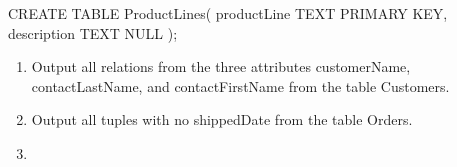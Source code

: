 \begin{enumerate}
  CREATE TABLE ProductLines(
    productLine TEXT PRIMARY KEY,
    description TEXT NULL
  );

  \begin{enumerate}
    \item

    Output all relations from the three attributes customerName, contactLastName, and contactFirstName from the table Customers.

    \item

    Output all tuples with no shippedDate from the table Orders.

    \item

  \end{enumerate}


\end{enumerate}





